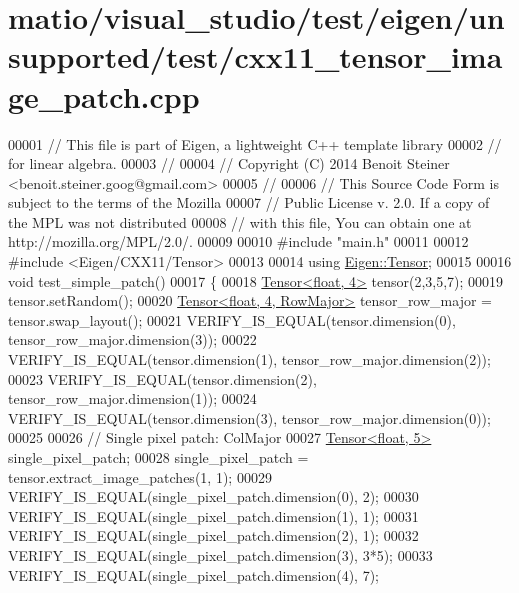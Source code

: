 \hypertarget{matio_2visual__studio_2test_2eigen_2unsupported_2test_2cxx11__tensor__image__patch_8cpp_source}{}\section{matio/visual\+\_\+studio/test/eigen/unsupported/test/cxx11\+\_\+tensor\+\_\+image\+\_\+patch.cpp}
\label{matio_2visual__studio_2test_2eigen_2unsupported_2test_2cxx11__tensor__image__patch_8cpp_source}

\begin{DoxyCode}
00001 \textcolor{comment}{// This file is part of Eigen, a lightweight C++ template library}
00002 \textcolor{comment}{// for linear algebra.}
00003 \textcolor{comment}{//}
00004 \textcolor{comment}{// Copyright (C) 2014 Benoit Steiner <benoit.steiner.goog@gmail.com>}
00005 \textcolor{comment}{//}
00006 \textcolor{comment}{// This Source Code Form is subject to the terms of the Mozilla}
00007 \textcolor{comment}{// Public License v. 2.0. If a copy of the MPL was not distributed}
00008 \textcolor{comment}{// with this file, You can obtain one at http://mozilla.org/MPL/2.0/.}
00009 
00010 \textcolor{preprocessor}{#include "main.h"}
00011 
00012 \textcolor{preprocessor}{#include <Eigen/CXX11/Tensor>}
00013 
00014 \textcolor{keyword}{using} \hyperlink{class_eigen_1_1_tensor}{Eigen::Tensor};
00015 
00016 \textcolor{keywordtype}{void} test\_simple\_patch()
00017 \{
00018   \hyperlink{class_eigen_1_1_tensor}{Tensor<float, 4>} tensor(2,3,5,7);
00019   tensor.setRandom();
00020   \hyperlink{class_eigen_1_1_tensor}{Tensor<float, 4, RowMajor>} tensor\_row\_major = tensor.swap\_layout();
00021   VERIFY\_IS\_EQUAL(tensor.dimension(0), tensor\_row\_major.dimension(3));
00022   VERIFY\_IS\_EQUAL(tensor.dimension(1), tensor\_row\_major.dimension(2));
00023   VERIFY\_IS\_EQUAL(tensor.dimension(2), tensor\_row\_major.dimension(1));
00024   VERIFY\_IS\_EQUAL(tensor.dimension(3), tensor\_row\_major.dimension(0));
00025 
00026   \textcolor{comment}{// Single pixel patch: ColMajor}
00027   \hyperlink{class_eigen_1_1_tensor}{Tensor<float, 5>} single\_pixel\_patch;
00028   single\_pixel\_patch = tensor.extract\_image\_patches(1, 1);
00029   VERIFY\_IS\_EQUAL(single\_pixel\_patch.dimension(0), 2);
00030   VERIFY\_IS\_EQUAL(single\_pixel\_patch.dimension(1), 1);
00031   VERIFY\_IS\_EQUAL(single\_pixel\_patch.dimension(2), 1);
00032   VERIFY\_IS\_EQUAL(single\_pixel\_patch.dimension(3), 3*5);
00033   VERIFY\_IS\_EQUAL(single\_pixel\_patch.dimension(4), 7);

\end{DoxyCode}
